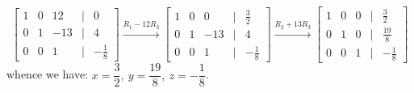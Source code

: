\begin{solution}
\[\begin{bmatrix}
     1&0&12&\vert&0\\
     0&1&-13&\vert&4\\
     0&0&1&\vert&-\frac{1}{8}
 \end{bmatrix} 
 \xrightarrow{R_1-12R_3}
 \begin{bmatrix}
     1&0&0&\vert&\frac{3}{2}\\
     0&1&-13&\vert&4\\
     0&0&1&\vert&-\frac{1}{8}
 \end{bmatrix} 
 \xrightarrow{R_2+13R_3}
 \begin{bmatrix}
     1&0&0&\vert&\frac{3}{2}\\
     0&1&0&\vert&\frac{19}{8}\\
     0&0&1&\vert&-\frac{1}{8}
 \end{bmatrix} 
 \]
 whence we have: $x=\dfrac{3}{2},\: y=\dfrac{19}{8},\: z=-\dfrac{1}{8}$.
 \end{solution}

 \bigskip


